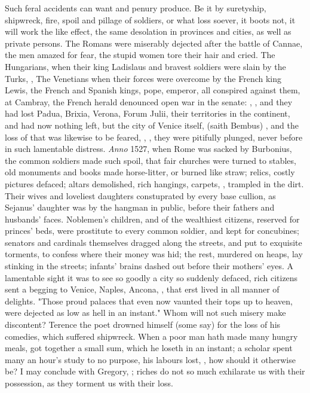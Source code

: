 Such feral accidents can want and penury produce. Be it by suretyship,
shipwreck, fire, spoil and pillage of soldiers, or what loss soever, it boots
not, it will work the like effect, the same desolation in provinces and cities,
as well as private persons. The Romans were miserably dejected after the battle
of Cannae, the men amazed for fear, the stupid women tore their hair and cried.
The Hungarians, when their king Ladislaus and bravest soldiers were slain by
the Turks, , \etc{} The Venetians when their forces were
overcome by the French king Lewis, the French and Spanish kings, pope, emperor,
all conspired against them, at Cambray, the French herald denounced open war in
the senate: , \etc{}, and they had lost Padua,
Brixia, Verona, Forum Julii, their territories in the continent, and had now
nothing left, but the city of Venice itself,  (saith
Bembus) , and the loss of that was
likewise to be feared, , \etc{}, they were pitifully plunged, never before in such lamentable
distress. \emph{Anno} 1527, when Rome was sacked by Burbonius, the common
soldiers made such spoil, that fair churches were turned
to stables, old monuments and books made horse-litter, or burned like straw;
relics, costly pictures defaced; altars demolished, rich hangings, carpets,
\etc{}, trampled in the dirt. Their wives and loveliest
daughters constuprated by every base cullion, as Sejanus' daughter was by the
hangman in public, before their fathers and husbands' faces. Noblemen's
children, and of the wealthiest citizens, reserved for princes' beds, were
prostitute to every common soldier, and kept for concubines; senators and
cardinals themselves dragged along the streets, and put to exquisite torments,
to confess where their money was hid; the rest, murdered on heaps, lay stinking
in the streets; infants' brains dashed out before their mothers' eyes. A
lamentable sight it was to see so goodly a city so suddenly defaced, rich
citizens sent a begging to Venice, Naples, Ancona, \etc{}, that erst lived in
all manner of delights. "Those proud palaces that even now
vaunted their tops up to heaven, were dejected as low as hell in an instant."
Whom will not such misery make discontent? Terence the poet drowned himself
(some say) for the loss of his comedies, which suffered shipwreck. When a poor
man hath made many hungry meals, got together a small sum, which he loseth in
an instant; a scholar spent many an hour's study to no purpose, his labours
lost, \etc{}, how should it otherwise be? I may conclude with Gregory,
; riches do not so much exhilarate us with their
possession, as they torment us with their loss.

